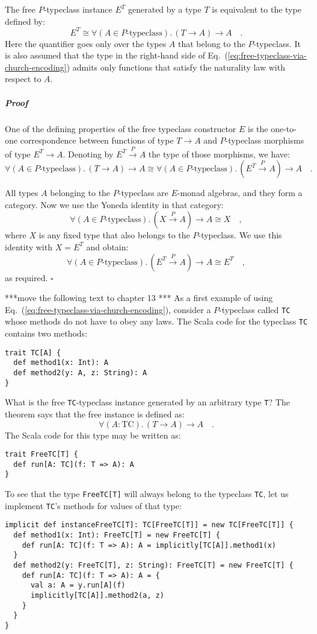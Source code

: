 The free $P$-typeclass instance $E^{T}$ generated by a type $T$
is equivalent to the type defined by:
\begin{equation}
E^{T}\cong\forall(A\in P\text{-typeclass}).\,(T\rightarrow A)\rightarrow A\quad.\label{eq:free-typeclass-via-church-encoding}
\end{equation}
Here the quantifier goes only over the types $A$ that belong to the
$P$-typeclass. It is also assumed that the type in the right-hand
side of Eq.~(\ref{eq:free-typeclass-via-church-encoding}) admits
only functions that satisfy the naturality law with respect to $A$.

\subparagraph{Proof}

One of the defining properties of the free typeclass constructor $E$
is the one-to-one correspondence between functions of type $T\rightarrow A$
and $P$-typeclass morphisms of type $E^{T}\rightarrow A$. Denoting
by $E^{T}\overset{P}{\rightarrow}A$ the type of those morphisms,
we have:
\[
\forall(A\in P\text{-typeclass}).\,(T\rightarrow A)\rightarrow A\cong\forall(A\in P\text{-typeclass}).\,(E^{T}\overset{P}{\rightarrow}A)\rightarrow A\quad.
\]

All types $A$ belonging to the $P$-typeclass are $E$-monad algebras,
and they form a category. Now we use the Yoneda identity in that category:
\[
\forall(A\in P\text{-typeclass}).\,(X\overset{P}{\rightarrow}A)\rightarrow A\cong X\quad,
\]
where $X$ is any fixed type that also belongs to the $P$-typeclass.
We use this identity with $X=E^{T}$ and obtain:
\[
\forall(A\in P\text{-typeclass}).\,(E^{T}\overset{P}{\rightarrow}A)\rightarrow A\cong E^{T}\quad,
\]
as required. $\square$

{*}{*}{*}move the following text to chapter 13 {*}{*}{*} As a first
example of using Eq.~(\ref{eq:free-typeclass-via-church-encoding}),
consider a $P$-typeclass called \lstinline!TC! whose methods do
not have to obey any laws. The Scala code for the typeclass \lstinline!TC!
contains two methods:
\begin{lstlisting}
trait TC[A] {
  def method1(x: Int): A
  def method2(y: A, z: String): A
}
\end{lstlisting}
What is the free \lstinline!TC!-typeclass instance generated by an
arbitrary type \lstinline!T!? The theorem says that the free instance
is defined as:
\[
\forall(A:\text{TC}).\,(T\rightarrow A)\rightarrow A\quad.
\]
The Scala code for this type may be written as:
\begin{lstlisting}
trait FreeTC[T] {
  def run[A: TC](f: T => A): A
}
\end{lstlisting}
To see that the type \lstinline!FreeTC[T]! will always belong to
the typeclass \lstinline!TC!, let us implement \lstinline!TC!\textsf{'}s
methods for values of that type:
\begin{lstlisting}
implicit def instanceFreeTC[T]: TC[FreeTC[T]] = new TC[FreeTC[T]] {
  def method1(x: Int): FreeTC[T] = new FreeTC[T] {
    def run[A: TC](f: T => A): A = implicitly[TC[A]].method1(x)
  }
  def method2(y: FreeTC[T], z: String): FreeTC[T] = new FreeTC[T] {
    def run[A: TC](f: T => A): A = {
      val a: A = y.run[A](f)
      implicitly[TC[A]].method2(a, z)
    }
  }
}
\end{lstlisting}

